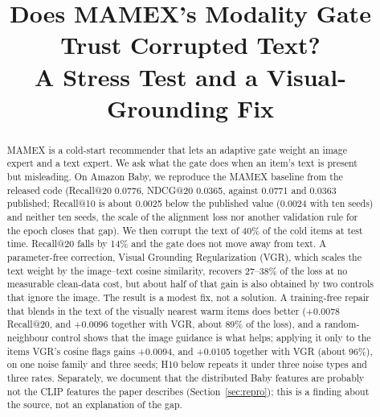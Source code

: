 \documentclass[conference]{IEEEtran}
\begin{document}
\title{Does MAMEX's Modality Gate Trust Corrupted Text?\\
A Stress Test and a Visual-Grounding Fix}

\author{
}

\maketitle

\begin{abstract}
MAMEX is a cold-start recommender that lets an adaptive gate weight an image expert and a text expert. We ask what the gate does when an item's text is present but misleading. On Amazon Baby, we reproduce the MAMEX baseline from the released code (Recall@20 0.0776, NDCG@20 0.0365, against 0.0771 and 0.0363 published; Recall@10 is about 0.0025 below the published value (0.0024 with ten seeds) and neither ten seeds, the scale of the alignment loss nor another validation rule for the epoch closes that gap). We then corrupt the text of 40\% of the cold items at test time. Recall@20 falls by 14\% and the gate does not move away from text. A parameter-free correction, Visual Grounding Regularization (VGR), which scales the text weight by the image--text cosine similarity, recovers 27--38\% of the loss at no measurable clean-data cost, but about half of that gain is also obtained by two controls that ignore the image. The result is a modest fix, not a solution. A training-free repair that blends in the text of the visually nearest warm items does better (+0.0078 Recall@20, and +0.0096 together with VGR, about 89\% of the loss), and a random-neighbour control shows that the image guidance is what helps; applying it only to the items VGR's cosine flags gains +0.0094, and +0.0105 together with VGR (about 96\%), on one noise family and three seeds; H10 below repeats it under three noise types and three rates. Separately, we document that the distributed Baby features are probably not the CLIP features the paper describes (Section~\ref{sec:repro}); this is a finding about the source, not an explanation of the gap.
\end{abstract}
\end{document}

